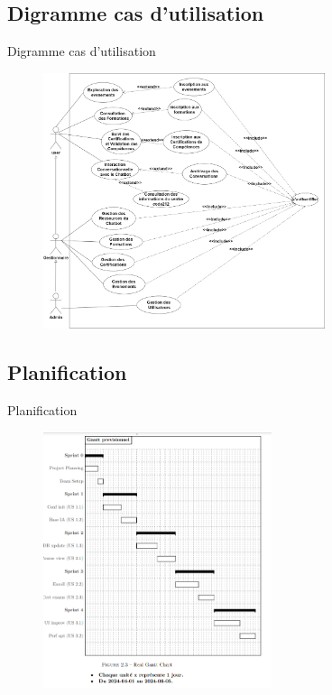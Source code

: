 \documentclass{beamer}
\begin{document}
\subsection{Digramme cas d'utilisation}
\begin{frame}{Digramme cas d'utilisation}
 \begin{figure}[htpb]
        \centering
        \includegraphics[height=7.5cm]{pic/usecase.png}
    \end{figure}
\end{frame}

\subsection{Planification}
\begin{frame}{Planification}
 
 \begin{figure}[htpb]
        \centering
        \includegraphics[height=7.5cm]{pic/gantt.png}
    \end{figure}
\end{frame}
\end{document}
